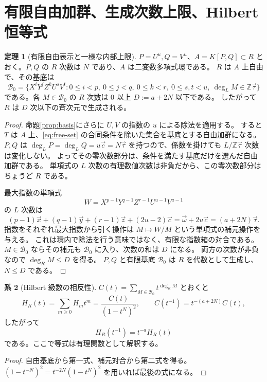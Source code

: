 \documentclass[11pt,a4paper]{ltjsarticle}
\numberwithin{equation}{section}
\theoremstyle{definition}
\newtheorem{theorem}{定理}[section]
\newtheorem{corollary}[theorem]{系}
\newcommand{\Z}{\mathbb Z}\newcommand{\N}{\mathbb N}\newcommand{\Q}{\mathbb Q}\newcommand{\C}{\mathbb C}
\newcommand{\xx}{\vec x}\newcommand{\yy}{\vec y}\newcommand{\zz}{\vec z}\newcommand{\cc}{\vec c}\newcommand{\ww}{\vec\omega}\newcommand{\ttau}{\vec\tau}
\begin{document}
\section{有限自由加群、生成次数上限、Hilbert 恒等式}\label{sec:finite}
\begin{theorem}[有限自由表示と一様な内部上限]\label{thm:free}
$P=U^u,Q=V^u$、$A=K[P,Q]\subset R$ とおく。$P,Q$ の $R$ 次数は $N$ であり、$A$ は二変数多項式環である。
$R$ は $A$ 上自由で、その基底は
\begin{equation}\label{eq:free-set}
 \mathcal B_0=\{X^iY^jZ^k U^sV^t:
 0\le i<p,\ 0\le j<q,\ 0\le k<r,\ 0\le s,t<u,
 \ \deg_L M\in\Z\ttau\}
\end{equation}
である。各 $M\in\mathcal B_0$ の $R$ 次数は $0$ 以上 $D:=a+2N$ 以下である。
したがって $R$ は $D$ 次以下の斉次元で生成される。
\end{theorem}
\begin{proof}
命題\ref{prop:basis}にさらに $U,V$ の指数の $u$ による除法を適用する。
すると $T$ は $A$ 上、\eqref{eq:free-set} の合同条件を除いた集合を基底とする自由加群になる。
$P,Q$ は $\deg_L P=\deg_L Q=u\cc=N\ttau$ を持つので、係数を掛けても $L/\Z\ttau$ 次数は変化しない。
よってその零次数部分は、条件を満たす基底だけを選んだ自由加群である。
単項式の $L$ 次数の有理数値次数は非負だから、この零次数部分はちょうど $R$ である。

最大指数の単項式
\[
 W=X^{p-1}Y^{q-1}Z^{r-1}U^{u-1}V^{u-1}
\]
の $L$ 次数は
\[
 (p-1)\xx+(q-1)\yy+(r-1)\zz+(2u-2)\cc
 =\ww+2u\cc=(a+2N)\ttau.
\]
指数をそれぞれ最大指数から引く操作は $M\mapsto W/M$ という単項式の補元操作を与える。
これは環内で除法を行う意味ではなく、有限な指数箱の対合である。
$M\in\mathcal B_0$ ならその補元も $\mathcal B_0$ に入り、次数の和は $D$ になる。
両方の次数が非負なので $\deg_R M\le D$ を得る。
$P,Q$ と有限基底 $\mathcal B_0$ は $R$ を代数として生成し、$N\le D$ である。
\end{proof}

\begin{corollary}[Hilbert 級数の相反性]\label{cor:reciprocity}
$C(t)=\sum_{M\in\mathcal B_0}t^{\deg_R M}$ とおくと
\begin{equation}\label{eq:hilbert-rational}
 H_R(t)=\sum_{m\ge0}H_mt^m=\frac{C(t)}{(1-t^N)^2},\qquad
 C(t^{-1})=t^{-(a+2N)}C(t),
\end{equation}
したがって
\begin{equation}\label{eq:reciprocity}
 H_R(t^{-1})=t^{-a}H_R(t)
\end{equation}
である。ここで等式は有理関数として解釈する。
\end{corollary}
\begin{proof}
自由基底から第一式、補元対合から第二式を得る。
$(1-t^{-N})^2=t^{-2N}(1-t^N)^2$ を用いれば最後の式になる。
\end{proof}
\end{document}
